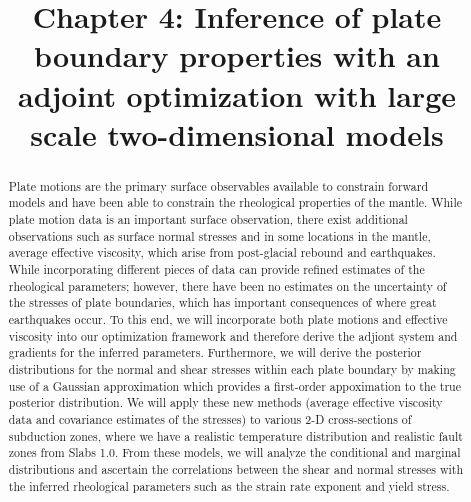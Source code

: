 \documentclass[12pt]{article}
\date{}
\title{Chapter 4: Inference of plate boundary properties with an adjoint optimization with large scale two-dimensional models}
\begin{document}
\maketitle
\begin{abstract}
 Plate motions are the primary surface observables available to constrain forward models and have been able to constrain the rheological properties of the mantle. While plate motion data is an important surface observation, there exist additional observations such as surface normal stresses and in some locations in the mantle, average effective viscosity, which arise from post-glacial rebound and earthquakes. While incorporating different pieces of data can provide refined estimates of the rheological parameters; however, there have been no estimates on the uncertainty of the stresses of plate boundaries, which has important consequences of where great earthquakes occur.  To this end, we will incorporate both plate motions and effective viscosity into our optimization framework and therefore derive the adjiont system and gradients for the inferred parameters. Furthermore, we will derive the posterior distributions for the normal and shear stresses within each plate boundary by making use of a Gaussian approximation which provides a first-order appoximation to the true posterior distribution. We will apply these new methods (average effective viscosity data and covariance estimates of the stresses) to various 2-D cross-sections of subduction zones, where we have a realistic temperature distribution and realistic fault zones from Slabs 1.0. From these models, we will analyze the conditional and marginal distributions and ascertain the correlations between the shear and normal stresses with the inferred rheological parameters such as the strain rate exponent and yield stress.
\end{abstract} 
\end{document}
